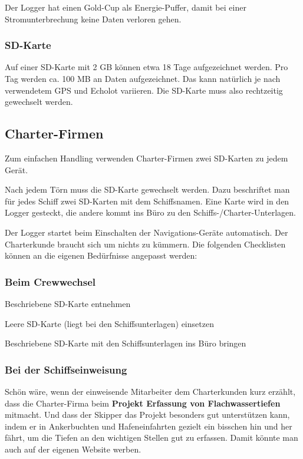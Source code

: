 \documentclass[pdftex, fontsize=8pt, paper=130mm:92mm,pagesize]{scrartcl}
\begin{document}
Der Logger hat einen Gold-Cup als Energie-Puffer, damit bei einer Stromunterbrechung keine Daten verloren gehen.	

\subsubsection{SD-Karte}

Auf einer SD-Karte mit 2 GB können etwa 18 Tage aufgezeichnet werden. Pro Tag werden ca. 100 MB an Daten aufgezeichnet. Das kann natürlich je nach verwendetem GPS und Echolot variieren. 
Die SD-Karte muss also rechtzeitig gewechselt werden. 

\subsection{Charter-Firmen}

Zum einfachen Handling verwenden Charter-Firmen zwei SD-Karten zu jedem Gerät. 

Nach jedem Törn muss die SD-Karte gewechselt werden. Dazu beschriftet man für jedes Schiff zwei SD-Karten mit dem Schiffsnamen. Eine Karte wird in den Logger gesteckt, die andere kommt ins Büro zu den Schiffs-/Charter-Unterlagen. 

Der Logger startet beim Einschalten der Navigations-Geräte automatisch. Der Charterkunde braucht sich um nichts zu kümmern. Die folgenden Checklisten können an die eigenen Bedürfnisse angepasst werden: 

\subsubsection{Beim Crewwechsel} 
\begin{compactenum}
\item Beschriebene SD-Karte entnehmen 
\item Leere SD-Karte (liegt bei den Schiffsunterlagen) einsetzen 
\item Beschriebene SD-Karte mit den Schiffsunterlagen ins Büro bringen 
\end{compactenum}

\subsubsection{Bei der Schiffseinweisung} 

Schön wäre, wenn der einweisende Mitarbeiter dem Charterkunden kurz erzählt, dass die Charter-Firma beim \textbf{Projekt \glqq Erfassung von Flachwassertiefen\grqq{}} mitmacht. Und dass der Skipper das Projekt besonders gut unterstützen kann, indem er in Ankerbuchten und Hafeneinfahrten gezielt ein bisschen hin und her fährt, um die Tiefen an den wichtigen Stellen gut zu erfassen. 
Damit könnte man auch auf der eigenen Website werben. 
\end{document}
